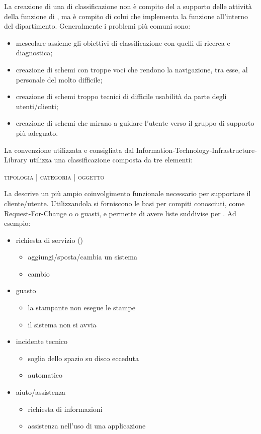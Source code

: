 La creazione di una  di classificazione non è compito del  a supporto delle attività della funzione di , ma è compito di colui che implementa la funzione all'interno del dipartimento. Generalmente i problemi più comuni sono:

\begin{itemize}
\item{mescolare assieme gli obiettivi di classificazione con quelli di ricerca e diagnostica;}
\item{creazione di schemi con troppe voci che rendono la navigazione, tra esse, al personale del  molto difficile;}
\item{creazione di schemi troppo tecnici di difficile usabilità da parte degli utenti/clienti;}
\item{creazione di schemi che mirano a guidare l'utente verso il gruppo di supporto più adeguato.}
\end{itemize}

La convenzione utilizzata e consigliata dal  \ac{Information-Technology-Infrastructure-Library} utilizza una classificazione composta da tre elementi:

\begin{center}
\textsc{tipologia} | \textsc{categoria} | \textsc{oggetto}
\end{center}

La  descrive un più ampio coinvolgimento funzionale necessario per supportare il cliente/utente. Utilizzandola si forniscono le basi per compiti conosciuti, come \ac{Request-For-Change} o  o guasti, e permette di avere liste suddivise per . Ad esempio:

\begin{itemize}
\item{richiesta di servizio ()}
\begin{itemize}
\item{aggiungi/sposta/cambia un sistema}
\item{cambio }
\end{itemize}
\item{guasto}
\begin{itemize}
\item{la stampante non esegue le stampe}
\item{il sistema non si avvia}
\end{itemize}
\item{incidente tecnico}
\begin{itemize}
\item{soglia dello spazio su disco ecceduta}
\item{ automatico}
\end{itemize}
\item{aiuto/assistenza}
\begin{itemize}
\item{richiesta di informazioni}
\item{assistenza nell'uso di una applicazione}
\end{itemize}
\end{itemize}

